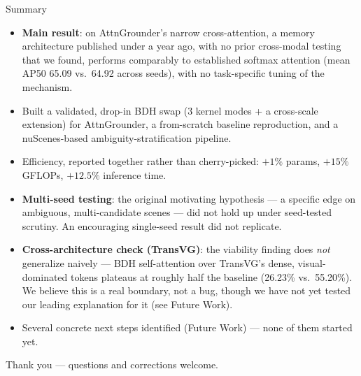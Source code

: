 \documentclass[aspectratio=169]{beamer}
\begin{document}
\begin{frame}{Summary}
  \scriptsize
  \begin{itemize}
    \item \textbf{Main result}: on AttnGrounder's narrow cross-attention,
      a memory architecture published under a year ago, with no prior
      cross-modal testing that we found, performs comparably to
      established softmax attention (mean AP50 65.09 vs.\ 64.92 across
      seeds), with no task-specific tuning of the mechanism.
    \item Built a validated, drop-in BDH swap (3 kernel modes + a
      cross-scale extension) for AttnGrounder, a from-scratch baseline
      reproduction, and a nuScenes-based ambiguity-stratification
      pipeline.
    \item Efficiency, reported together rather than cherry-picked:
      $+1\%$ params, $+15\%$ GFLOPs, $+12.5\%$ inference time.
    \item \textbf{Multi-seed testing}: the original motivating
      hypothesis — a specific edge on ambiguous, multi-candidate
      scenes — did not hold up under seed-tested scrutiny. An
      encouraging single-seed result did not replicate.
    \item \textbf{Cross-architecture check (TransVG)}: the viability
      finding does \emph{not} generalize naively — BDH self-attention
      over TransVG's dense, visual-dominated tokens plateaus at
      roughly half the baseline (26.23\% vs.\ 55.20\%). We believe this
      is a real boundary, not a bug, though we have not yet tested our
      leading explanation for it (see Future Work).
    \item Several concrete next steps identified (Future Work) — none
      of them started yet.
  \end{itemize}
  \vspace{0.3cm}
  \centering\Large Thank you --- questions and corrections welcome.
\end{frame}
\end{document}
